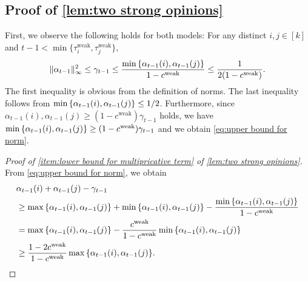 \documentclass[letterpaper,11pt]{article}
\newcommand{\alphanorm}{\gamma}
\newcommand{\cweak}{c^{\mathrm{weak}}}
\newcommand{\tauiweak}{\tau^{\mathrm{weak}}_i}
\newcommand{\taujweak}{\tau^{\mathrm{weak}}_j}
\begin{document}
\subsection{\texorpdfstring{Proof of \cref{lem:two strong opinions}}{Proof of Special cases}}\label{sec:special inequalities}
First, we observe the following holds for both models:
For any distinct $i,j\in [k]$ and $t-1<\min\{\tauiweak,\taujweak\}$, 
\begin{align}
    \|\alpha_{t-1}\|_\infty^2\leq \alphanorm_{t-1} \leq \frac{\min\qty{\alpha_{t-1}(i),\alpha_{t-1}(j)}}{1-\cweak} \leq \frac{1}{2(1-\cweak)}.
    \label{eq:upper bound for norm} 
\end{align}
    The first inequality is obvious from the definition of norms.
    The last inequality follows from $\min\qty{\alpha_{t-1}(i),\alpha_{t-1}(j)}\leq 1/2$.
    Furthermore, since $\alpha_{t-1}(i),\alpha_{t-1}(j)\geq (1-\cweak)\alphanorm_{t-1}$ holds, we have 
    $\min\qty{\alpha_{t-1}(i),\alpha_{t-1}(j)}\geq (1-\cweak)\alphanorm_{t-1}$ and we obtain \cref{eq:upper bound for norm}.
\begin{proof}[Proof of \cref{item:lower bound for multipricative term} of \cref{lem:two strong opinions}]
    From \cref{eq:upper bound for norm}, we obtain
    \begin{align*}
        &\alpha_{t-1}(i)+\alpha_{t-1}(j)-\alphanorm_{t-1}\\
        &\geq \max\qty{\alpha_{t-1}(i),\alpha_{t-1}(j)}+\min\qty{\alpha_{t-1}(i),\alpha_{t-1}(j)}-\frac{\min\qty{\alpha_{t-1}(i),\alpha_{t-1}(j)}}{1-\cweak}\\
        &= \max\qty{\alpha_{t-1}(i),\alpha_{t-1}(j)}-\frac{\cweak}{1-\cweak}\min\qty{\alpha_{t-1}(i),\alpha_{t-1}(j)}\\
        &\geq \frac{1-2\cweak}{1-\cweak}\max\qty{\alpha_{t-1}(i),\alpha_{t-1}(j)}.
    \end{align*}
\end{proof}
\end{document}
